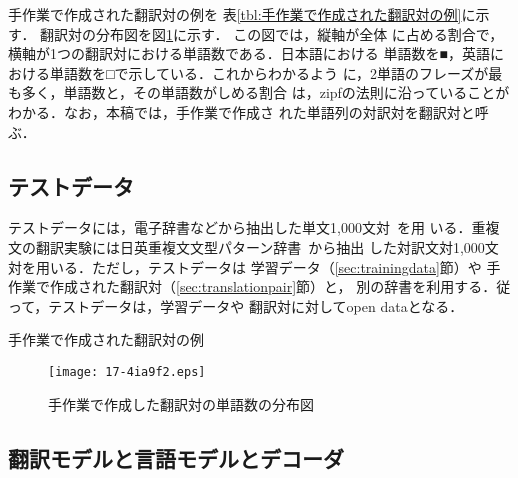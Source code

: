 \documentclass[japanese]{jnlp_1.4}
\begin{document}
手作業で作成された翻訳対の例を
表{\ref{tbl:手作業で作成された翻訳対の例}}に示す．
翻訳対の分布図を図{\ref{fig:手作業で作成した翻訳対の単語数の分布図}}に示す．
この図では，縦軸が全体
に占める割合で，横軸が1つの翻訳対における単語数である．日本語における
単語数を■，英語における単語数を□で示している．これからわかるよう
に，2単語のフレーズが最も多く，単語数と，その単語数がしめる割合
は，zipfの法則に沿っていることがわかる．なお，本稿では，手作業で作成さ
れた単語列の対訳対を翻訳対と呼ぶ．


\subsection{テストデータ}
\label{sec:testdata}

テストデータには，電子辞書などから抽出した単文1,000文対~\cite{murakami}を用
いる．重複文の翻訳実験には日英重複文文型パターン辞書~\cite{tori}から抽出
した対訳文対1,000文対を用いる．ただし，テストデータは
学習データ（\ref{sec:trainingdata}節）や
手作業で作成された翻訳対（\ref{sec:translationpair}節）と，
別の辞書を利用する．従って，テストデータは，学習データや
翻訳対に対してopen dataとなる．

\begin{table}[t]
\caption{手作業で作成された翻訳対の例}
\label{tbl:手作業で作成された翻訳対の例}

\end{table}
\begin{figure}[t]
\begin{center}
\texttt{[image: 17-4ia9f2.eps]}
\end{center}
\caption{手作業で作成した翻訳対の単語数の分布図}
\label{fig:手作業で作成した翻訳対の単語数の分布図}
\vspace{-1\baselineskip}
\end{figure}




\subsection{翻訳モデルと言語モデルとデコーダ}
\end{document}
